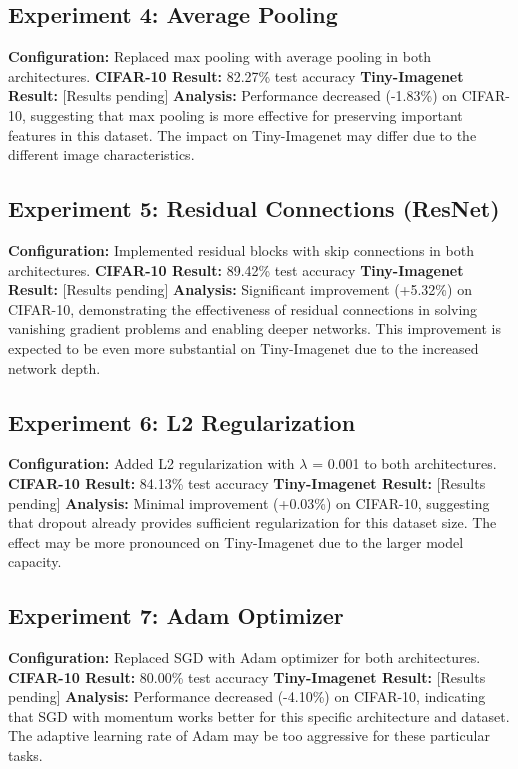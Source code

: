 \documentclass{article}
\begin{document}
\subsection{Experiment 4: Average Pooling}
\textbf{Configuration:} Replaced max pooling with average pooling in both architectures.
\textbf{CIFAR-10 Result:} 82.27\% test accuracy
\textbf{Tiny-Imagenet Result:} [Results pending]
\textbf{Analysis:} Performance decreased (-1.83\%) on CIFAR-10, suggesting that max pooling is more effective for preserving important features in this dataset. The impact on Tiny-Imagenet may differ due to the different image characteristics.

\subsection{Experiment 5: Residual Connections (ResNet)}
\textbf{Configuration:} Implemented residual blocks with skip connections in both architectures.
\textbf{CIFAR-10 Result:} 89.42\% test accuracy
\textbf{Tiny-Imagenet Result:} [Results pending]
\textbf{Analysis:} Significant improvement (+5.32\%) on CIFAR-10, demonstrating the effectiveness of residual connections in solving vanishing gradient problems and enabling deeper networks. This improvement is expected to be even more substantial on Tiny-Imagenet due to the increased network depth.

\subsection{Experiment 6: L2 Regularization}
\textbf{Configuration:} Added L2 regularization with $\lambda$ = 0.001 to both architectures.
\textbf{CIFAR-10 Result:} 84.13\% test accuracy
\textbf{Tiny-Imagenet Result:} [Results pending]
\textbf{Analysis:} Minimal improvement (+0.03\%) on CIFAR-10, suggesting that dropout already provides sufficient regularization for this dataset size. The effect may be more pronounced on Tiny-Imagenet due to the larger model capacity.

\subsection{Experiment 7: Adam Optimizer}
\textbf{Configuration:} Replaced SGD with Adam optimizer for both architectures.
\textbf{CIFAR-10 Result:} 80.00\% test accuracy
\textbf{Tiny-Imagenet Result:} [Results pending]
\textbf{Analysis:} Performance decreased (-4.10\%) on CIFAR-10, indicating that SGD with momentum works better for this specific architecture and dataset. The adaptive learning rate of Adam may be too aggressive for these particular tasks.
\end{document}
